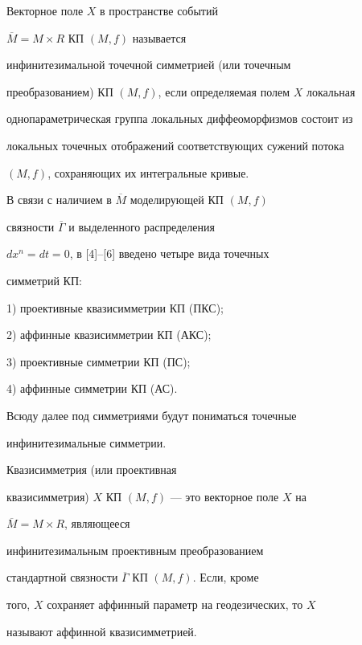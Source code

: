 \begin{defn}


Векторное поле $X$ в пространстве событий


$\overline{M}=M\times R$ КП $(M,f)$ называется


инфинитезимальной точечной симметрией (или точечным


преобразованием) КП $(M,f)$, если определяемая полем $X$ локальная


однопараметрическая группа локальных диффеоморфизмов состоит из


локальных точечных отображений соответствующих сужений потока


$(M,f)$, сохраняющих их интегральные кривые.


\end{defn}





В связи с наличием в $\overline{M} $ моделирующей КП $(M,f) $


связности $\overline{ \Gamma}$ и выделенного распределения


$dx^n=dt=0$, в [4]--[6] введено четыре вида точечных


симметрий КП:





1) проективные квазисимметрии КП (ПКС);





2) аффинные квазисимметрии КП (АКС);





3) проективные симметрии КП (ПС);





4) аффинные симметрии КП (АС).





Всюду далее под симметриями будут пониматься точечные 


инфинитезимальные симметрии.





\begin{defn}


Квазисимметрия (или проективная


квазисимметрия) $X$ КП $(M,f) $ --- это векторное поле $X$ на


$\overline{M} =M\times R$, являющееся


инфинитезимальным проективным преобразованием


стандартной связности $\overline{ \Gamma}$ КП $(M,f)$. Если, кроме


того, $X$ сохраняет аффинный параметр на геодезических, то $X$


называют аффинной квазисимметрией.


\end{defn}





